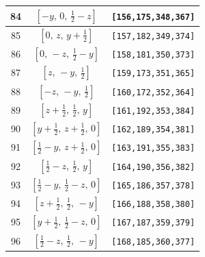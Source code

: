\documentclass[fleqn,8pt]{jsarticle}
\begin{document}
\begin{longtable}{ccc}
84 & $\left[ - y,\, 0,\, \frac{1}{2} - z \right]$ & {\tt [156,175,348,367]} \\ \hline
85 & $\left[ 0,\, z,\, y + \frac{1}{2} \right]$ & {\tt [157,182,349,374]} \\ \hline
86 & $\left[ 0,\, - z,\, \frac{1}{2} - y \right]$ & {\tt [158,181,350,373]} \\ \hline
87 & $\left[ z,\, - y,\, \frac{1}{2} \right]$ & {\tt [159,173,351,365]} \\ \hline
88 & $\left[ - z,\, - y,\, \frac{1}{2} \right]$ & {\tt [160,172,352,364]} \\ \hline
89 & $\left[ z + \frac{1}{2},\, \frac{1}{2},\, y \right]$ & {\tt [161,192,353,384]} \\ \hline
90 & $\left[ y + \frac{1}{2},\, z + \frac{1}{2},\, 0 \right]$ & {\tt [162,189,354,381]} \\ \hline
91 & $\left[ \frac{1}{2} - y,\, z + \frac{1}{2},\, 0 \right]$ & {\tt [163,191,355,383]} \\ \hline
92 & $\left[ \frac{1}{2} - z,\, \frac{1}{2},\, y \right]$ & {\tt [164,190,356,382]} \\ \hline
93 & $\left[ \frac{1}{2} - y,\, \frac{1}{2} - z,\, 0 \right]$ & {\tt [165,186,357,378]} \\ \hline
94 & $\left[ z + \frac{1}{2},\, \frac{1}{2},\, - y \right]$ & {\tt [166,188,358,380]} \\ \hline
95 & $\left[ y + \frac{1}{2},\, \frac{1}{2} - z,\, 0 \right]$ & {\tt [167,187,359,379]} \\ \hline
96 & $\left[ \frac{1}{2} - z,\, \frac{1}{2},\, - y \right]$ & {\tt [168,185,360,377]} \\
\end{longtable}
\renewcommand{\arraystretch}{1.2}
\end{document}
